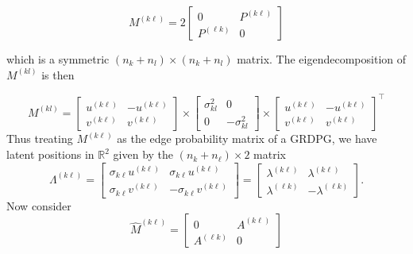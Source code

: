 \documentclass[12pt]{article}
\begin{document}
\[M^{(k \ell)} = 2 \begin{bmatrix} 0 & P^{(k \ell)} \\ P^{(\ell k)} & 0 \end{bmatrix}\]

which is a symmetric \((n_k + n_l) \times (n_k + n_l)\) matrix. The
eigendecomposition of \(M^{(kl)}\) is then

\[M^{(kl)} = 
\begin{bmatrix} u^{(k \ell)} & -u^{(k \ell)} \\ v^{(k \ell)} & v^{(k \ell)} \end{bmatrix} \times 
\begin{bmatrix} \sigma^2_{kl} & 0 \\ 0 & -\sigma^2_{kl} \end{bmatrix} \times
\begin{bmatrix} u^{(k \ell)} & -u^{(k \ell)} \\ v^{(k \ell)} & v^{(k \ell)} \end{bmatrix}^\top\]
Thus treating \(M^{(k \ell)}\) as the edge probability matrix of a GRDPG, we
have latent positions in \(\mathbb{R}^2\) given by the $(n_k + n_{\ell}) \times 2$ matrix
\[\Lambda^{(k \ell)} = \begin{bmatrix} 
  \sigma_{k \ell} u^{(k \ell)} & \sigma_{k \ell} u^{(k \ell)} \\ 
  \sigma_{k \ell} v^{(k \ell)} & -\sigma_{k \ell} v^{(k \ell)} 
\end{bmatrix} = 
\begin{bmatrix} 
  \lambda^{(k \ell)} & \lambda^{(k \ell)} \\ 
  \lambda^{( \ell k)} & -\lambda^{( \ell k)} 
\end{bmatrix}.\]
Now consider
\[\hat{M}^{(k \ell)} = \begin{bmatrix} 0 & A^{(k \ell)} \\ A^{(\ell k)} & 0 \end{bmatrix}\]

\end{document}
